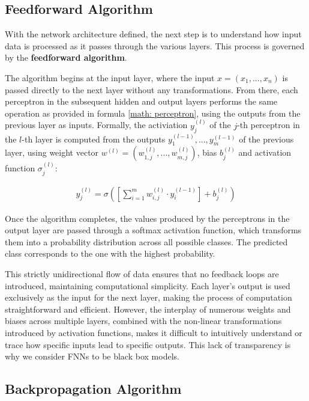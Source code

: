 \subsection{Feedforward Algorithm}
With the network architecture defined,
the next step is to understand how input data is processed as it passes through the various layers.
This process is governed by the \textbf{feedforward algorithm}.

The algorithm begins at the input layer,
where the input $x = (x_1, ..., x_n)$ is passed directly to the next layer without any transformations. 
From there, each perceptron in the subsequent hidden and output layers
performs the same operation as provided in formula \ref{math: perceptron},
using the outputs from the previous layer as inputs.
Formally, the activiation $y_j^{(l)}$ of the $j$-th perceptron in the $l$-th layer
is computed from the outputs $y_1^{(l-1)}, ..., y_m^{(l-1)}$ of the previous layer,
using weight vector $w^{(l)} = (w_{1,j}^{(l)}, ..., w_{m,j}^{(l)})$, bias $b_j^{(l)}$
and activation function $\sigma_j^{(l)}$:

\begin{align}
	y_j^{(l)} = \sigma\left(\left[\sum_{i = 1}^m w_{i,j}^{(l)} \cdot y_i^{(l-1)} \right] + b_j^{(l)}\right)
\end{align}

Once the algorithm completes, 
the values produced by the perceptrons in the output layer are passed through a softmax activation function,
which transforms them into a probability distribution across all possible classes.
The predicted class corresponds to the one with the highest probability.

This strictly unidirectional flow of data ensures that no feedback loops are introduced,
maintaining computational simplicity.
Each layer's output is used exclusively as the input for the next layer,
making the process of computation straightforward and efficient.
However, the interplay of numerous weights and biases across multiple layers,
combined with the non-linear transformations introduced by activation functions,
makes it difficult to intuitively understand or trace how specific inputs lead to specific outputs.
This lack of transparency is why we consider FNNs to be black box models.

\subsection{Backpropagation Algorithm}

